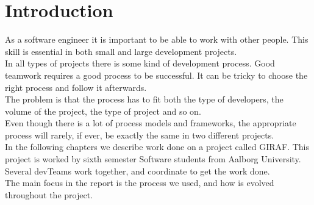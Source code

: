 \section{Introduction}

As a software engineer it is important to be able to work with other people. This skill is essential in both small and large development projects. \\
In all types of projects there is some kind of development process. Good teamwork requires a good process to be successful. It can be tricky to choose the right process and follow it afterwards. \\
The problem is that the process has to fit both the type of developers, the volume of the project, the type of project and so on. \\
Even though there is a lot of process models and frameworks, the appropriate process will rarely, if ever, be exactly the same in two different projects.\\
In the following chapters we describe work done on a project called GIRAF. This project is worked by sixth semester Software students from Aalborg University. Several \glspl{devTeam} work together, and coordinate to get the work done.\\
The main focus in the report is the process we used, and how is evolved throughout the project. 

